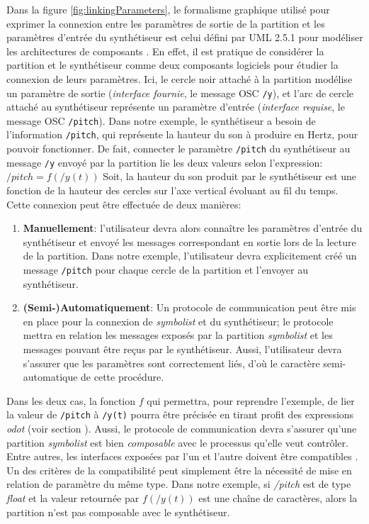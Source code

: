 Dans la figure \ref{fig:linkingParameters}, le formalisme graphique utilisé pour exprimer la connexion entre les paramètres de sortie de la partition et les paramètres d'entrée du synthétiseur est celui défini par UML 2.5.1 pour modéliser les architectures de composants \cite{omg2017}. En effet, il est pratique de considérer la partition et le synthétiseur comme deux composants logiciels pour étudier la connexion de leurs paramètres. Ici, le cercle noir attaché à la partition modélise un paramètre de sortie (\textit{interface fournie}, le message OSC \texttt{/y}), et l'arc de cercle attaché au synthétiseur représente un paramètre d'entrée (\textit{interface requise}, le message OSC \texttt{/pitch}).
Dans notre exemple, le synthétiseur a besoin de l'information \texttt{/pitch}, qui représente la hauteur du son à produire en Hertz, pour pouvoir fonctionner.
De fait, connecter le paramètre \texttt{/pitch} du synthétiseur au message \texttt{/y} envoyé par la partition lie les deux valeurs selon l'expression: $/pitch = f(/y(t))$
Soit, la hauteur du son produit par le synthétiseur est une fonction de la hauteur des cercles sur l'axe vertical évoluant au fil du temps. Cette connexion peut être effectuée de deux manières: 
\begin{enumerate}[label={(\arabic*)}]
	\item \textbf{Manuellement}: l'utilisateur devra alors connaître les paramètres d'entrée du synthétiseur et envoyé les messages correspondant en sortie lors de la lecture de la partition. Dans notre exemple, l'utilisateur devra explicitement créé un message \texttt{/pitch} pour chaque cercle de la partition et l'envoyer au synthétiseur.
	\item \textbf{(Semi-)Automatiquement}: Un protocole de communication peut être mis en place pour la connexion de \textit{symbolist} et du synthétiseur; le protocole mettra en relation les messages exposés par la partition \textit{symbolist} et les messages pouvant être reçus par le synthétiseur. Aussi, l'utilisateur devra s'assurer que les paramètres sont correctement liés, d'où le caractère semi-automatique de cette procédure. 
\end{enumerate}
%
Dans les deux cas, la fonction $f$ qui permettra, pour reprendre l'exemple, de lier la valeur de \texttt{/pitch} à \texttt{/y(t)} pourra être précisée en tirant profit des expressions \textit{odot} (voir section ).
Aussi, le protocole de communication devra s'assurer qu'une partition \textit{symbolist} est bien \textit{composable} avec le processus qu'elle veut contrôler. Entre autres, les interfaces exposées par l'un et l'autre doivent être compatibles \cite{chen2007}. Un des critères de la compatibilité peut simplement être la nécessité de mise en relation de paramètre du même type. Dans notre exemple, si \textit{/pitch} est de type \textit{float} et la valeur retournée par $f(/y(t))$ est une chaîne de caractères, alors la partition n'est pas composable avec le synthétiseur.


